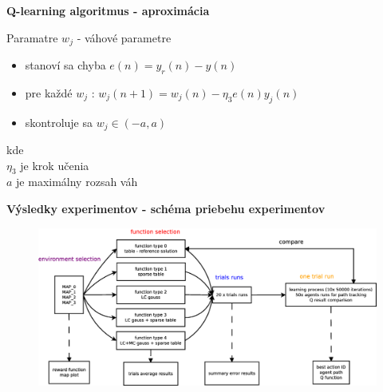 \documentclass[xcolor=dvipsnames]{beamer}
\begin{document}
\begin{frame}{\bf Q-learning algoritmus - aproximácia}

Paramatre $w_{j}$ - váhové parametre

\begin{itemize}
\item stanoví sa chyba $e(n) = y_r(n) - y(n)$
\item pre každé $w_{j}$ : $w_j(n+1)= w_j(n) -\eta_3 e(n)y_j(n)$
\item skontroluje sa $w_j \in (-a, a)$
\end{itemize}

kde \\
$\eta_3$ je krok učenia \\
$a$ je maximálny rozsah váh \\
\end{frame}


\begin{frame}{\bf Výsledky experimentov - schéma priebehu experimentov}

\begin{figure}[!htb]
\centering
\includegraphics[scale=.22]{../diagrams/experiment_map_q_learning.eps}
\end{figure}

\end{frame}
\end{document}
